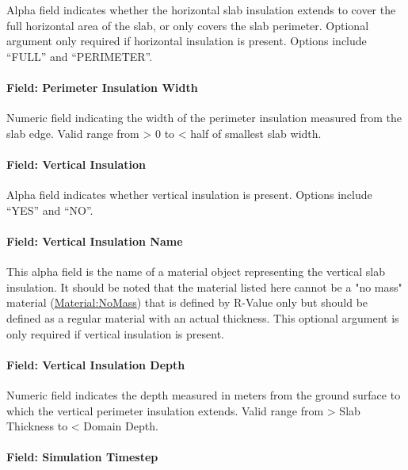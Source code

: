 Alpha field indicates whether the horizontal slab insulation extends to cover the full horizontal area of the slab, or only covers the slab perimeter. Optional argument only required if horizontal insulation is present. Options include ``FULL'' and ``PERIMETER''.

\paragraph{Field: Perimeter Insulation Width}\label{field-perimeter-insulation-width}

Numeric field indicating the width of the perimeter insulation measured from the slab edge. Valid range from \textgreater{} 0 to \textless{} half of smallest slab width.

\paragraph{Field: Vertical Insulation}\label{field-vertical-insulation}

Alpha field indicates whether vertical insulation is present. Options include ``YES'' and ``NO''.

\paragraph{Field: Vertical Insulation Name}\label{field-vertical-insulation-name}

This alpha field is the name of a material object representing the vertical slab insulation. It should be noted that the material listed here cannot be a "no mass" material  (\hyperref[materialnomass]{Material:NoMass}) that is defined by R-Value only but should be defined as a regular material with an actual thickness. This optional argument is only required if vertical insulation is present.

\paragraph{Field: Vertical Insulation Depth}\label{field-vertical-insulation-depth}

Numeric field indicates the depth measured in meters from the ground surface to which the vertical perimeter insulation extends. Valid range from \textgreater{} Slab Thickness to \textless{} Domain Depth.

\paragraph{Field: Simulation Timestep}\label{field-simulation-timestep}

